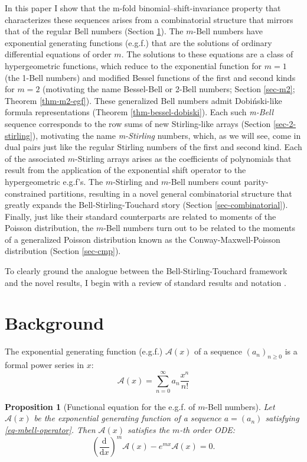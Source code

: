 \documentclass[a4paper]{amsart}
\newtheorem{proposition}[theorem]{Proposition}
\begin{document}
In this paper I show that the m-fold binomial–shift-invariance property that characterizes these sequences arises from a combinatorial structure that mirrors that of the regular Bell numbers (Section \ref{sec-background}). The $m$-Bell numbers have exponential generating functions (e.g.f.) that are the solutions of ordinary differential equations of order $m$. The solutions to these equations are a class of hypergeometric functions, which reduce to the exponential function for $m=1$ (the 1-Bell numbers) and modified Bessel functions of the first and second kinds for $m=2$ (motivating the name Bessel-Bell or 2-Bell numbers; Section \ref{sec-m2}; Theorem \ref{thm-m2-egf}). These generalized Bell numbers admit Dobiński-like formula representations (Theorem \ref{thm-bessel-dobiski}). Each such \textit{m-Bell} sequence corresponds to the row sums of new Stirling-like arrays (Section \ref{sec-2-stirling}), motivating the name \textit{m-Stirling }numbers, which, as we will see, come in dual pairs just like the regular Stirling numbers of the first and second kind. Each of the associated $m$-Stirling arrays arises as the coefficients of polynomials that result from the application of the exponential shift operator to the hypergeometric e.g.f's. The $m$-Stirling and $m$-Bell numbers count parity-constrained partitions, resulting in a novel general combinatorial structure that greatly expands the Bell-Stirling-Touchard story (Section \ref{sec-combinatorial}). Finally, just like their standard counterparts are related to moments of the Poisson distribution, the $m$-Bell numbers turn out to be related to the moments of a generalized Poisson distribution known as the Conway-Maxwell-Poisson distribution \cite{shmueliUsefulDistributionFitting2005} (Section \ref{sec-cmp}).

To clearly ground the analogue between the Bell-Stirling-Touchard framework and the novel results, I begin with a review of standard results and notation \cite{comtet1974, sándor2004}.

\section{Background}\label{sec-background}
\noindent The exponential generating function (e.g.f.) $\mathcal{A}(x)$ of a sequence $(a_n)_{n \geq 0}$ is a formal power series in $x$:
\[
\mathcal{A}(x) = \sum_{n=0}^\infty a_n \frac{x^n}{n!}
\]

\begin{proposition}[Functional equation for the e.g.f. of $m$-Bell numbers]\label{prop:mbell-egf}
Let $\mathcal{A}(x)$ be the exponential generating function of a sequence \( a = (a_n) \) satisfying \eqref{eq-mbell-operator}.
Then \( \mathcal{A}(x) \) satisfies the $m$-th order ODE:
\[
\left(\frac{\mathrm{d}}{\mathrm{d}x}\right)^m \mathcal{A}(x) - e^{mx} \mathcal{A}(x) = 0.
\]
\end{proposition}
\end{document}
